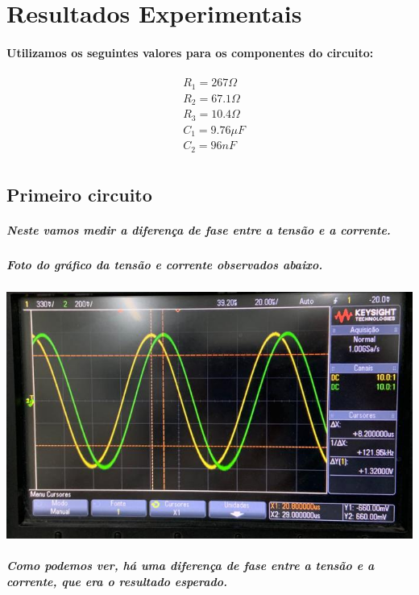 \documentclass[12pt,twoside, a4paper, twocolumn]{article}
\begin{document}
\section{Resultados Experimentais}

\paragraph*{Utilizamos os seguintes valores para os componentes do circuito:}

\begin{equation}
    \begin{aligned}
         & R_1 = 267\varOmega   \\
         & R_2 = 67.1 \varOmega \\
         & R_3 = 10.4 \varOmega \\
         & C_1 = 9.76 \mu F     \\
         & C_2 = 96 nF          \\
    \end{aligned}
\end{equation}
\newpage
\subsection*{Primeiro circuito}

\subparagraph*{Neste vamos medir a diferença de fase entre a tensão e a corrente.}
\subparagraph*{Foto do gráfico da tensão e corrente observados abaixo.}
\subparagraph*{}
\begin{adjustbox}{scale=0.3}
    \includegraphics{circuito1.png}
\end{adjustbox}

\subparagraph*{Como podemos ver, há uma diferença de fase entre a tensão e a corrente, que era o resultado esperado.}
\end{document}
